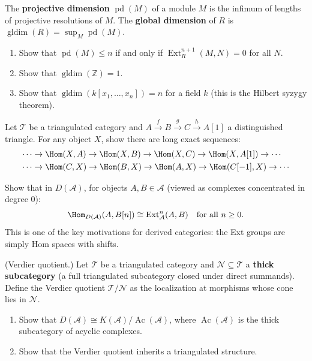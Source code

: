 \begin{exercise}\label{exo:global-dimension}
The \textbf{projective dimension} $\operatorname{pd}(M)$ of a module $M$ is the infimum of
lengths of projective resolutions of $M$. The \textbf{global dimension} of $R$ is
$\operatorname{gldim}(R) = \sup_M \operatorname{pd}(M)$.
\begin{enumerate}
    \item Show that $\operatorname{pd}(M) \leq n$ if and only if $\operatorname{Ext}^{n+1}_R(M, N) = 0$
    for all $N$.
    \item Show that $\operatorname{gldim}(\mathbb{Z}) = 1$.
    \item Show that $\operatorname{gldim}(k[x_1, \ldots, x_n]) = n$ for a field $k$
    (this is the Hilbert syzygy theorem).
\end{enumerate}
\end{exercise}

\begin{exercise}\label{exo:triangulated-hom}
Let $\mathcal{T}$ be a triangulated category and $A \xrightarrow{f} B \xrightarrow{g} C
\xrightarrow{h} A[1]$ a distinguished triangle. For any object $X$, show there are long
exact sequences:
\begin{align*}
    \cdots &\to \Hom(X, A) \to \Hom(X, B) \to \Hom(X, C) \to \Hom(X, A[1]) \to \cdots \\
    \cdots &\to \Hom(C, X) \to \Hom(B, X) \to \Hom(A, X) \to \Hom(C[-1], X) \to \cdots
\end{align*}
\end{exercise}

\begin{exercise}\label{exo:derived-cat-Hom-Ext}
Show that in $D(\mathcal{A})$, for objects $A, B \in \mathcal{A}$ (viewed as complexes
concentrated in degree 0):
\[
    \Hom_{D(\mathcal{A})}(A, B[n]) \cong \operatorname{Ext}^n_{\mathcal{A}}(A, B)
    \quad \text{for all } n \geq 0.
\]
This is one of the key motivations for derived categories: the Ext groups are simply
Hom spaces with shifts.
\end{exercise}

\begin{exercise}\label{exo:verdier-quotient}
(Verdier quotient.) Let $\mathcal{T}$ be a triangulated category and
$\mathcal{N} \subseteq \mathcal{T}$ a \textbf{thick subcategory} (a full triangulated
subcategory closed under direct summands). Define the Verdier quotient $\mathcal{T}/\mathcal{N}$
as the localization at morphisms whose cone lies in $\mathcal{N}$.
\begin{enumerate}
    \item Show that $D(\mathcal{A}) \cong K(\mathcal{A}) / \operatorname{Ac}(\mathcal{A})$,
    where $\operatorname{Ac}(\mathcal{A})$ is the thick subcategory of acyclic complexes.
    \item Show that the Verdier quotient inherits a triangulated structure.
\end{enumerate}
\end{exercise}
